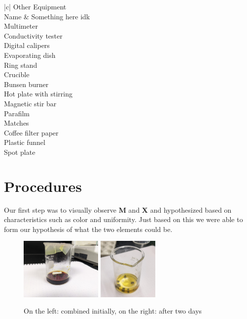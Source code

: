 \documentclass[titlepage]{article}
\begin{document}
\begin{tabular}{ |c| } 
    \hline
    {Other Equipment} \\
    \hline
    Name & Something here idk \\
    \hline
    Multimeter \\
    Conductivity tester \\
    Digital calipers \\
    Evaporating dish \\
    Ring stand \\
    Crucible \\
    Bunsen burner \\
    Hot plate with stirring \\
    Magnetic stir bar \\
    Parafilm \\
    Matches \\
    Coffee filter paper \\
    Plastic funnel \\
    Spot plate \\

    \hline
\end{tabular}

\renewcommand*{\thefootnote}{\arabic{footnote}}
\section{Procedures}

Our first step was to visually observe \textbf{M} and \textbf{X} and hypothesized based on characteristics such as color and uniformity. Just based on this we were able to form our hypothesis of what the two elements could be.

\begin{figure}[h]
    \centering
    \includegraphics[height=3cm]{MX_initial.png}
    \includegraphics[height=3cm]{MX_final.png}
    \caption{On the left:  combined initially, on the right:  after two days}
    \label{fig:mx_comparison}
\end{figure}
\end{document}
